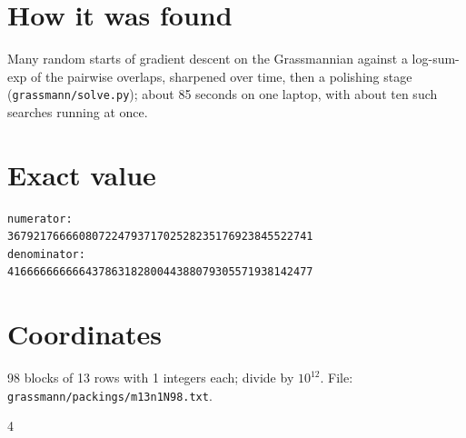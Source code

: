 \documentclass[11pt,a4paper]{article}
\begin{document}
\section{How it was found}
Many random starts of gradient descent on the Grassmannian against a log-sum-exp of the pairwise overlaps, sharpened over time, then a polishing stage (\texttt{grassmann/solve.py}); about 85 seconds on one laptop, with about ten such searches running at once.


\appendix
\section{Exact value}
{\small
\begin{verbatim}
numerator:
36792176666080722479371702528235176923845522741
denominator:
41666666666643786318280044388079305571938142477
\end{verbatim}}

\section{Coordinates}
98 blocks of 13 rows with 1 integers each; divide by $10^{12}$. File: \texttt{grassmann/packings/m13n1N98.txt}.
{\tiny
\begin{multicols}{4}
\end{multicols}}
\end{document}
